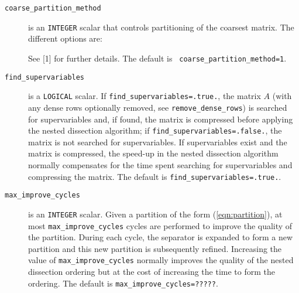 \begin{description}
\item[\texttt{coarse\_partition\_method}] is an {\tt INTEGER} scalar that 
controls partitioning of the coarsest matrix. The different options are:
See [1] for further details. The default is {\tt
coarse\_partition\_method=1}. 


\item[\texttt{find\_supervariables}] is a {\tt LOGICAL} scalar. If 
{\tt find\_supervariables=.true.}, the matrix $A$ (with any dense rows 
optionally removed, see {\tt remove\_dense\_rows}) is searched for 
supervariables and, if found, the matrix is compressed before applying the 
nested dissection algorithm; if {\tt find\_supervariables=.false.}, the matrix 
is not searched for supervariables. If supervariables exist and the matrix is 
compressed, the speed-up in the nested dissection algorithm normally 
compensates for the time spent searching for supervariables and compressing the 
matrix. The default is {\tt find\_supervariables=.true.}.



\item[\texttt{max\_improve\_cycles}] is an {\tt INTEGER} scalar. Given a partition of the 
form (\ref{eqn:partition}), at most {\tt max\_improve\_cycles} cycles are 
performed to improve the quality of the partition. During each cycle, the 
separator is expanded to form a new partition and this new partition is 
subsequently refined. Increasing the value of {\tt max\_improve\_cycles} normally improves 
the quality of the nested dissection ordering but at the cost of increasing the 
time to form the ordering. The default is {\tt max\_improve\_cycles=?????}.


\end{description}
